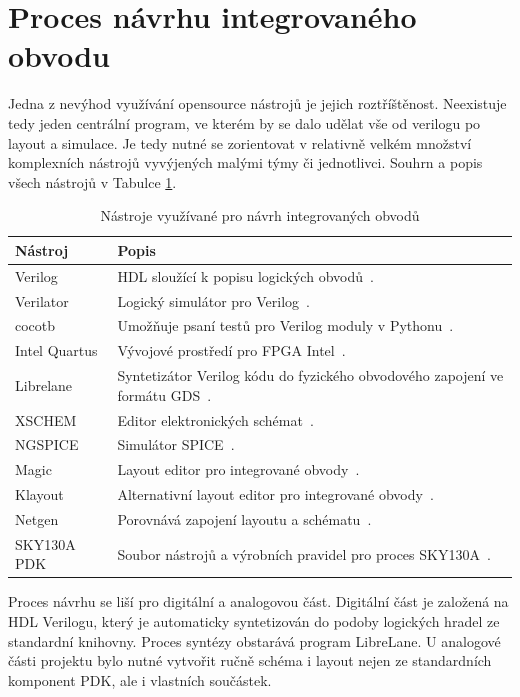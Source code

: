 \section{Proces návrhu integrovaného obvodu}
Jedna z nevýhod využívání opensource nástrojů je jejich roztříštěnost. Neexistuje tedy jeden centrální program, ve kterém by se dalo udělat vše od verilogu po layout a simulace. Je tedy nutné se zorientovat 
v relativně velkém množství komplexních nástrojů vyvýjených malými týmy či jednotlivci. Souhrn a popis všech nástrojů v Tabulce \ref{tab:nastroje_ic_design}.
\begin{table}[!ht]
    \centering
    \caption[Nástroje využívané pro návrh integrovaných obvodů]{Nástroje využívané pro návrh integrovaných obvodů}\label{tab:nastroje_ic_design}
    \begin{tabular}{|l|l|}
    \hline
        \textbf{Nástroj} & \textbf{Popis} \\ \hline
        Verilog & HDL sloužící k popisu logických obvodů~\cite{verilog_ieee}. \\ \hline
        Verilator & Logický simulátor pro Verilog~\cite{verilator}. \\ \hline
        cocotb & Umožňuje psaní testů pro Verilog moduly v Pythonu~\cite{cocotb}. \\ \hline
        Intel Quartus & Vývojové prostředí pro FPGA Intel~\cite{intel_quartus}. \\ \hline
        Librelane & Syntetizátor Verilog kódu do fyzického obvodového zapojení ve formátu GDS~\cite{librelane}. \\ \hline
        XSCHEM & Editor elektronických schémat~\cite{xschem}. \\ \hline
        NGSPICE & Simulátor SPICE~\cite{ngspice}. \\ \hline
        Magic & Layout editor pro integrované obvody~\cite{magic_vlsi}. \\ \hline
        Klayout & Alternativní layout editor pro integrované obvody~\cite{klayout}. \\ \hline
        Netgen & Porovnává zapojení layoutu a schématu~\cite{netgen_lvs}. \\ \hline
        SKY130A PDK & Soubor nástrojů a výrobních pravidel pro proces SKY130A~\cite{STG2020}. \\ \hline
    \end{tabular}
\end{table}

Proces návrhu se liší pro digitální a analogovou část. Digitální část je založená na HDL Verilogu, který je automaticky syntetizován do podoby logických hradel ze standardní knihovny. Proces syntézy obstarává program LibreLane.
U analogové části projektu bylo nutné vytvořit ručně schéma i layout nejen ze standardních komponent PDK, ale i vlastních součástek.
\newpage
